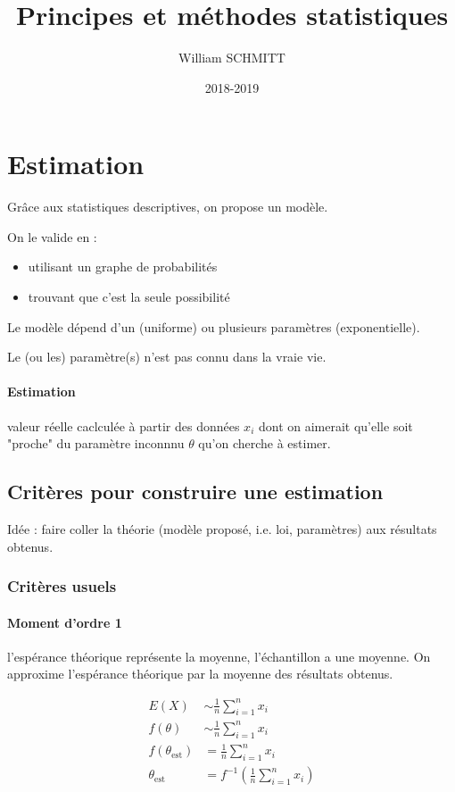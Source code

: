 \documentclass[11pt]{article}
\title{Principes et méthodes statistiques}
\author{William SCHMITT}
\date{2018-2019}
\begin{document}
\maketitle

\tableofcontents

\section{Estimation}
Grâce aux statistiques descriptives, on propose un modèle.

On le valide en :
\begin{itemize}
    \item utilisant un graphe de probabilités
    \item trouvant que c'est la seule possibilité
\end{itemize}

Le modèle dépend d'un (uniforme) ou plusieurs paramètres (exponentielle).

Le (ou les) paramètre(s) n'est pas connu dans la vraie vie.

\paragraph{Estimation} valeur réelle caclculée à partir des données $x_i$ dont on aimerait qu'elle soit "proche" du paramètre inconnnu $\theta$ qu'on cherche à estimer.

\subsection{Critères pour construire une estimation}
Idée : faire coller la théorie (modèle proposé, i.e. loi, paramètres) aux résultats obtenus.
\subsubsection{Critères usuels}
\paragraph{Moment d'ordre 1} l'espérance théorique représente la moyenne, l'échantillon a une moyenne. On approxime l'espérance théorique par la moyenne des résultats obtenus.

\begin{align*}
    E(X) & \sim \frac{1}{n} \sum_{i=1}^n x_i \\
    f(\theta ) & \sim \frac{1}{n} \sum_{i = 1}^n x_i \\
    f(\theta_{\text{est}}) &= \frac{1}{n} \sum_{i=1}^n x_i \\
    \theta_{\text{est}} &= f^{-1}(\frac{1}{n} \sum_{i=1}^n x_i)
\end{align*}
\end{document}
